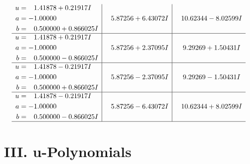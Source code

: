 \documentclass[1p]{elsarticle_modified}
\theoremstyle{definition}
\begin{document}
$$\begin{array}{c|c|c}
\begin{aligned}
u &= \phantom{-}1.41878 + 0.21917 I \\
a &= -1.00000\phantom{ +0.000000I} \\
b &= \phantom{-}0.500000 + 0.866025 I\end{aligned}
 & \phantom{-}5.87256 + 6.43072 I & \phantom{-}10.62344 - 8.02599 I \\ \hline\begin{aligned}
u &= \phantom{-}1.41878 + 0.21917 I \\
a &= -1.00000\phantom{ +0.000000I} \\
b &= \phantom{-}0.500000 - 0.866025 I\end{aligned}
 & \phantom{-}5.87256 + 2.37095 I & \phantom{-}9.29269 + 1.50431 I \\ \hline\begin{aligned}
u &= \phantom{-}1.41878 - 0.21917 I \\
a &= -1.00000\phantom{ +0.000000I} \\
b &= \phantom{-}0.500000 + 0.866025 I\end{aligned}
 & \phantom{-}5.87256 - 2.37095 I & \phantom{-}9.29269 - 1.50431 I \\ \hline\begin{aligned}
u &= \phantom{-}1.41878 - 0.21917 I \\
a &= -1.00000\phantom{ +0.000000I} \\
b &= \phantom{-}0.500000 - 0.866025 I\end{aligned}
 & \phantom{-}5.87256 - 6.43072 I & \phantom{-}10.62344 + 8.02599 I\\
 \hline 
 \end{array}$$\newpage
\newpage\renewcommand{\arraystretch}{1}
\centering \section*{ III. u-Polynomials}
\end{document}
